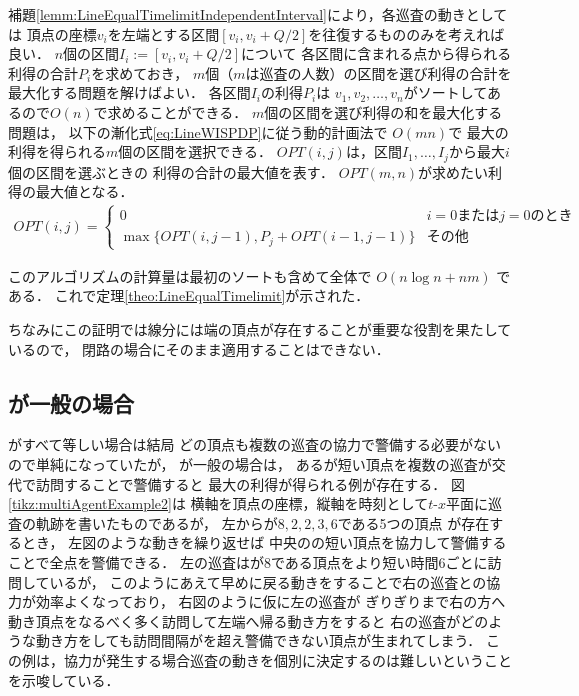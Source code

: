 補題\ref{lemm:LineEqualTimelimitIndependentInterval}により，各巡査の動きとしては
頂点の座標$v_i$を左端とする区間$[v_i, v_i + Q/2]$を往復するもののみを考えれば良い．
$n$個の区間$I_i := [v_i, v_i + Q/2]$について
各区間に含まれる点から得られる利得の合計$P_i$を求めておき，
$m$個（$m$は巡査の人数）の区間を選び利得の合計を最大化する問題を解けばよい．
%
各区間$I_i$の利得$P_i$は
$v_1,v_2,\ldots,v_n$がソートしてあるので$O(n)$で求めることができる．
%
$m$個の区間を選び利得の和を最大化する問題は，
以下の漸化式\ref{eq:LineWISPDP}に従う動的計画法で
$O(mn)$で
最大の利得を得られる$m$個の区間を選択できる．
$OPT(i,j)$は，区間$I_1, \ldots, I_j$から最大$i$個の区間を選ぶときの
利得の合計の最大値を表す．
$OPT(m,n)$が求めたい利得の最大値となる．
\begin{align}
	\label{eq:LineWISPDP}
	OPT(i,j) = 
	\begin{cases}
		0 & \text{$i = 0$または$j = 0$のとき} \\
		\max \{
			OPT(i, j - 1), 
			P_j + OPT(i - 1, j - 1)
		\}
		& \text{その他}
	\end{cases}
\end{align}

このアルゴリズムの計算量は最初のソートも含めて全体で $O(n \log n + nm)$ である．
これで定理\ref{theo:LineEqualTimelimit}が示された．



ちなみにこの証明では線分には端の頂点が存在することが重要な役割を果たしているので，
閉路の場合にそのまま適用することはできない．





\subsection{{\idletime}が一般の場合}
\label{subsec:LineDifferentTimelimit}

{\idletime}がすべて等しい場合は結局
どの頂点も複数の巡査の協力で警備する必要がないので単純になっていたが，
%
{\idletime}が一般の場合は，
ある{\idletime}が短い頂点を複数の巡査が交代で訪問することで警備すると
最大の利得が得られる例が存在する．
%
図\ref{tikz:multiAgentExample2}は
横軸を頂点の座標，縦軸を時刻として$t$-$x$平面に巡査の軌跡を書いたものであるが，
%
左から{\idletime}が$8,2,2,3,6$である5つの頂点
が存在するとき，
左図のような動きを繰り返せば
中央の{\idletime}の短い頂点を協力して警備することで全点を警備できる．
左の巡査は{\idletime}が$8$である頂点をより短い時間$6$ごとに訪問しているが，
このようにあえて早めに戻る動きをすることで右の巡査との協力が効率よくなっており，
右図のように仮に左の巡査が
{\idletime}ぎりぎりまで右の方へ動き頂点をなるべく多く訪問して左端へ帰る動き方をすると
右の巡査がどのような動き方をしても訪問間隔が{\idletime}を超え警備できない頂点が生まれてしまう．
%
この例は，協力が発生する場合巡査の動きを個別に決定するのは難しいということを示唆している．
%

